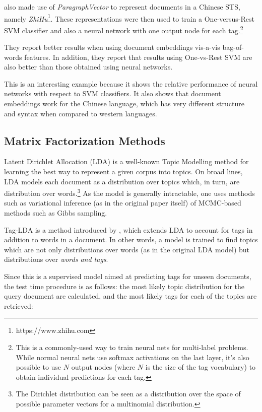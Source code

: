 \cite{tao_yao_2016} also made use of \textit{ParagraphVector} to represent documents in a Chinese STS, namely \textit{ZhiHu}\footnote{https://www.zhihu.com}. These representations were then used to train a One-versus-Rest SVM classifier and also a neural network with one output node for each tag.\footnote{This is a commonly-used way to train neural nets for multi-label problems. While normal neural nets use softmax activations on the last layer, it's also possible to use $N$ output nodes (where $N$ is the size of the tag vocabulary) to obtain individual predictions for each tag.}

They report better results when using document embeddings vis-a-vis bag-of-words features. In addition, they report that results using One-vs-Rest SVM are also better than those obtained using neural networks.

This is an interesting example because it shows the relative performance of neural networks with respect to SVM classifiers. It also shows that document embeddings work for the Chinese language, which has very different structure and syntax when compared to western languages.

\subsection{Matrix Factorization Methods}


Latent Dirichlet Allocation (LDA) \citep{blei_etal_2003} is a well-known Topic Modelling method for learning the best way to represent a given corpus into topics. On broad lines, LDA models each document as a distribution over topics which, in turn, are distribution over words.\footnote{The Dirichlet distribution can be seen as a distribution over the space of possible parameter vectors for a multinomial distribution.} As the model is generally intractable, one uses methods such as variational inference (as in the original paper itself) of MCMC-based methods such as Gibbs sampling.

Tag-LDA is a method introduced by \cite{si_sun_2008}, which extends LDA to account for tags in addition to words in a document. In other words, a model is trained to find topics which are not only distributions over words (as in the original LDA model) but distributions over \textit{words and tags}. 

Since this is a supervised model aimed at predicting tags for unseen documents, the test time procedure is as follows: the most likely topic distribution for the query document are calculated, and the most likely tags for each of the topics are retrieved:

